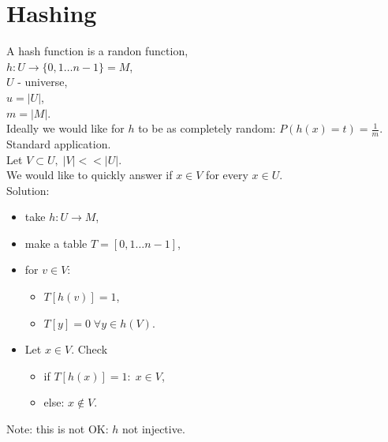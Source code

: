 \documentclass[a4paper, 12pt]{book}
\theoremstyle{definition}
\theoremstyle{remark}
\begin{document}
\chapter{Hashing}


A hash function is a randon function, \\
$h: U \to \{0, 1 \dots n-1\} = M$, \\
$U$ - universe, \\
$u = |U|$, \\
$m = |M|$. \\
Ideally we would like for $h$ to be as completely random: $P(h(x) = t) = \frac{1}{m}$. \\
Standard application. \\
Let $V \subset U, \; |V| << |U|$. \\
We would like to quickly answer if $x \in V$ for every $x \in U$. \\
Solution:
\begin{itemize}
  \item take $h: U \to M$,
  \item make a table $T = [0, 1 \dots n-1]$,
  \item for $v \in V$:
    \begin{itemize}[label={}]
      \item $T[h(v)] = 1$,
      \item $T[y] = 0 \; \forall y \in h(V)$.
    \end{itemize}
  \item Let $x \in V$. Check
    \begin{itemize}
      \item if $T[h(x)] = 1: \; x \in V$,
      \item else: $x \notin V$.
    \end{itemize}
\end{itemize}
Note: this is not OK: $h$ not injective.


\end{document}
